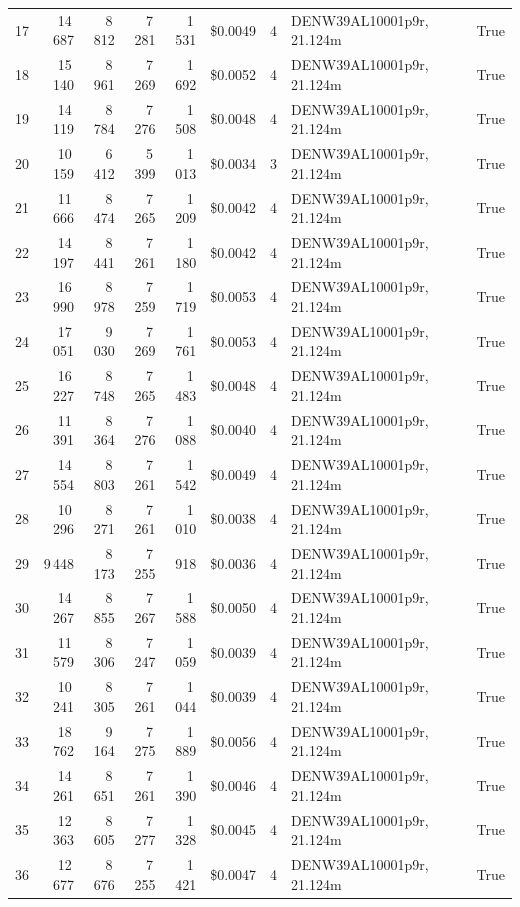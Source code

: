 \documentclass[a4paper,11pt]{article}
\begin{document}
\begin{table}[ht]
\begin{tabular}{r r r r r r r p{3cm} l}
17 & 14\,687 & 8\,812 & 7\,281 & 1\,531 & \$0.0049 & 4 & DENW39AL10001p9r, 21.124m & True \\
18 & 15\,140 & 8\,961 & 7\,269 & 1\,692 & \$0.0052 & 4 & DENW39AL10001p9r, 21.124m & True \\
19 & 14\,119 & 8\,784 & 7\,276 & 1\,508 & \$0.0048 & 4 & DENW39AL10001p9r, 21.124m & True \\
20 & 10\,159 & 6\,412 & 5\,399 & 1\,013 & \$0.0034 & 3 & DENW39AL10001p9r, 21.124m & True \\
21 & 11\,666 & 8\,474 & 7\,265 & 1\,209 & \$0.0042 & 4 & DENW39AL10001p9r, 21.124m & True \\
22 & 14\,197 & 8\,441 & 7\,261 & 1\,180 & \$0.0042 & 4 & DENW39AL10001p9r, 21.124m & True \\
23 & 16\,990 & 8\,978 & 7\,259 & 1\,719 & \$0.0053 & 4 & DENW39AL10001p9r, 21.124m & True \\
24 & 17\,051 & 9\,030 & 7\,269 & 1\,761 & \$0.0053 & 4 & DENW39AL10001p9r, 21.124m & True \\
25 & 16\,227 & 8\,748 & 7\,265 & 1\,483 & \$0.0048 & 4 & DENW39AL10001p9r, 21.124m & True \\
26 & 11\,391 & 8\,364 & 7\,276 & 1\,088 & \$0.0040 & 4 & DENW39AL10001p9r, 21.124m & True \\
27 & 14\,554 & 8\,803 & 7\,261 & 1\,542 & \$0.0049 & 4 & DENW39AL10001p9r, 21.124m & True \\
28 & 10\,296 & 8\,271 & 7\,261 & 1\,010 & \$0.0038 & 4 & DENW39AL10001p9r, 21.124m & True \\
29 & 9\,448 & 8\,173 & 7\,255 & 918 & \$0.0036 & 4 & DENW39AL10001p9r, 21.124m & True \\
30 & 14\,267 & 8\,855 & 7\,267 & 1\,588 & \$0.0050 & 4 & DENW39AL10001p9r, 21.124m & True \\
31 & 11\,579 & 8\,306 & 7\,247 & 1\,059 & \$0.0039 & 4 & DENW39AL10001p9r, 21.124m & True \\
32 & 10\,241 & 8\,305 & 7\,261 & 1\,044 & \$0.0039 & 4 & DENW39AL10001p9r, 21.124m & True \\
33 & 18\,762 & 9\,164 & 7\,275 & 1\,889 & \$0.0056 & 4 & DENW39AL10001p9r, 21.124m & True \\
34 & 14\,261 & 8\,651 & 7\,261 & 1\,390 & \$0.0046 & 4 & DENW39AL10001p9r, 21.124m & True \\
35 & 12\,363 & 8\,605 & 7\,277 & 1\,328 & \$0.0045 & 4 & DENW39AL10001p9r, 21.124m & True \\
36 & 12\,677 & 8\,676 & 7\,255 & 1\,421 & \$0.0047 & 4 & DENW39AL10001p9r, 21.124m & True \\

\end{tabular}
\end{table}
\end{document}
